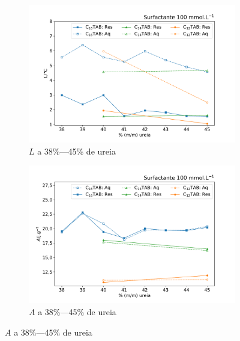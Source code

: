 	
	\begin{figure}[h]	
		\begin{subfigure}[t]{0.5\textwidth}
			\includegraphics[width=\textwidth]{./imagens/dsc/L_100mM_aq_res}
			\caption{\(L\) a 38\%---45\% de ureia}
			\label{fig:DSC_L_38_45pUr}
		\end{subfigure} %
		\begin{subfigure}[t]{0.5\textwidth}
			\includegraphics[width=\textwidth]{./imagens/dsc/A_100mM_aq_res}
			\caption{\(A\) a 38\%---45\% de ureia}
			\label{fig:DSC_A_38_45pUr}
		\end{subfigure} 
		

\end{figure}
